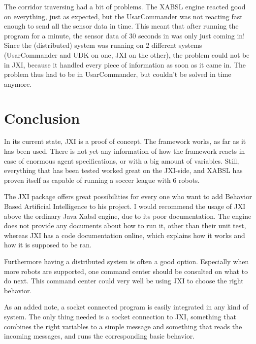 \documentclass[a4paper,10pt]{article}
\begin{document}
The corridor traversing had a bit of problems. The XABSL engine reacted good on
everything, just as expected, but the UsarCommander was not reacting fast enough
to send all the sensor data in time. This meant that after running the program
for a minute, the sensor data of 30 seconds in was only just coming in! Since
the (distributed) system was running on 2 different systems (UsarCommander and
UDK on one, JXI on the other), the problem could not be in JXI, because it
handled every piece of information as soon as it came in. The problem thus had
to be in UsarCommander, but couldn't be solved in time anymore.

\section{Conclusion}
In its current state, JXI is a proof of concept. The framework works, as far as
it has been used. There is not yet any information of how the framework reacts
in case of enormous agent specifications, or with a big amount of variables.
Still, everything that has been tested worked great on the JXI-side, and XABSL
has proven itself as capable of running a soccer league with 6 robots. 

The JXI package offers great possibilities for every one who want to add
Behavior Based Artificial Intelligence to his project. I would recommend the
usage of JXI above the ordinary Java Xabsl engine, due to its poor
documentation. The engine does not provide any documents about how to run it,
other than their unit test, whereas JXI has a code documentation online, which
explains how it works and how it is supposed to be ran. 

Furthermore having a distributed system is often a good option. Especially when
more robots are supported, one command center should be consulted on what to do
next. This command center could very well be using JXI to choose the right
behavior.

As an added note, a socket connected program is easily integrated in any kind of
system. The only thing needed is a socket connection to JXI, something that
combines the right variables to a simple message and something that reads the
incoming messages, and runs the corresponding basic behavior. 
\end{document}
